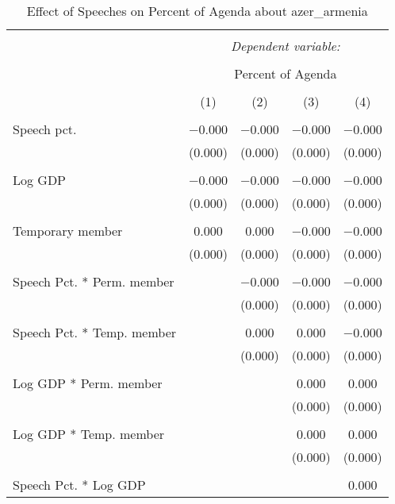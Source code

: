 
\begin{table}[!htbp] \centering 
  \caption{Effect of Speeches on Percent of Agenda about  azer_armenia} 
  \label{} 
\begin{tabular}{@{\extracolsep{5pt}}lcccc} 
\\[-1.8ex]\hline 
\hline \\[-1.8ex] 
 & \multicolumn{4}{c}{\textit{Dependent variable:}} \\ 
\cline{2-5} 
\\[-1.8ex] & \multicolumn{4}{c}{Percent of Agenda} \\ 
\\[-1.8ex] & (1) & (2) & (3) & (4)\\ 
\hline \\[-1.8ex] 
 Speech pct. & $-$0.000 & $-$0.000 & $-$0.000 & $-$0.000 \\ 
  & (0.000) & (0.000) & (0.000) & (0.000) \\ 
  & & & & \\ 
 Log GDP & $-$0.000 & $-$0.000 & $-$0.000 & $-$0.000 \\ 
  & (0.000) & (0.000) & (0.000) & (0.000) \\ 
  & & & & \\ 
 Temporary member & 0.000 & 0.000 & $-$0.000 & $-$0.000 \\ 
  & (0.000) & (0.000) & (0.000) & (0.000) \\ 
  & & & & \\ 
 Speech Pct. * Perm. member &  & $-$0.000 & $-$0.000 & $-$0.000 \\ 
  &  & (0.000) & (0.000) & (0.000) \\ 
  & & & & \\ 
 Speech Pct. * Temp. member &  & 0.000 & 0.000 & $-$0.000 \\ 
  &  & (0.000) & (0.000) & (0.000) \\ 
  & & & & \\ 
 Log GDP * Perm. member &  &  & 0.000 & 0.000 \\ 
  &  &  & (0.000) & (0.000) \\ 
  & & & & \\ 
 Log GDP * Temp. member &  &  & 0.000 & 0.000 \\ 
  &  &  & (0.000) & (0.000) \\ 
  & & & & \\ 
 Speech Pct. * Log GDP &  &  &  & 0.000 \\ 

\end{tabular}
\end{table}
